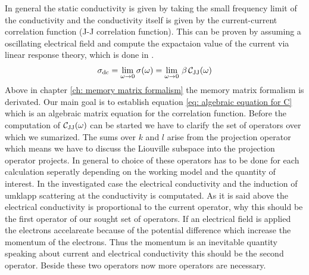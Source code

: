 In general the static conductivity is given by taking the small frequency limit of the conductivity and the conductivity itself is given by the current-current correlation function (J-J correlation function). This can be proven by assuming a oscillating electrical field and compute the expactaion value of the current via linear response theory, which is done in \cite{Chycholl2}.
%
\begin{align}
	\sigma_{\mathrm{dc}} = \lim\limits_{\omega \to 0} \sigma(\omega) = \lim\limits_{\omega \to 0}\, \beta\,\mathcal{C}_{\mathrm{JJ}}(\omega)
	\label{eq: general static condictivity}
\end{align}
%
Above in chapter \ref{ch: memory matrix formalism} the memory matrix formalism is derivated. 
Our main goal is to establish equation \eqref{eq: algebraic equation for C} which is an algebraic matrix equation for the correlation function.
Before the computation of $\mathcal{C}_{\mathrm{JJ}}(\omega)$ can be started we have to clarify the set of operators over which we sumarized.
The sums over $k$ and $l$ arise from the projection operator which means we have to discuss the Liouville subspace into the projection operator projects.
In general to choice of these operators has to be done for each calculation seperatly depending on the working model and the quantity of interest.
In the investigated case the electrical conductivity and the induction of umklapp scattering at the conductivity is computated.
As it is said above the electrical conductivity is proportional to the current operator, why this should be the first operator of our sought set of operators.
If an electrical field is applied the electrons accelareate because of the potential difference which increase the momentum of the electrons.
Thus the momentum is an inevitable quantity speaking about current and electrical conductivity this should be the second operator.
Beside these two operators now more operators are necessary.

